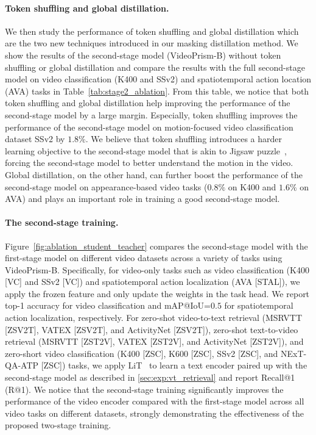 \documentclass{article}
\theoremstyle{plain}
\theoremstyle{definition}
\theoremstyle{remark}
\newcommand{\OURS}{VideoPrism\xspace}
\begin{document}
\paragraph{Token shuffling and global distillation.} We then study the performance of token shuffling and global distillation which are the two new techniques introduced in our masking distillation method.
We show the results of the second-stage model (\OURS-B) without token shuffling or global distillation and compare the results with the full second-stage model on video classification (K400 and SSv2) and spatiotemporal action location (AVA) tasks in Table~\ref{tab:stage2_ablation}.
From this table, we notice that both token shuffling and global distillation help improving the performance of the second-stage model by a large margin.
Especially, token shuffling improves the performance of the second-stage model on motion-focused video classification dataset SSv2 by $1.8\%$.
We believe that token shuffling introduces a harder learning objective to the second-stage model that is akin to Jigsaw puzzle~\cite{noroozi2016unsupervised}, forcing the second-stage model to better understand the motion in the video.
Global distillation, on the other hand, can further boost the performance of the second-stage model on appearance-based video tasks ($0.8\%$ on K400 and $1.6\%$ on AVA) and plays an important role in training a good second-stage model.

\paragraph{The second-stage training.} Figure~\ref{fig:ablation_student_teacher} compares the second-stage model with the first-stage model on different video datasets across a variety of tasks using \OURS-B.
Specifically, for video-only tasks such as video classification (K400 [VC] and SSv2 [VC]) and spatiotemporal action localization (AVA [STAL]), we apply the frozen feature and only update the weights in the task head.
We report top-1 accuracy for video classification and mAP@IoU=$0.5$ for spatiotemporal action localization, respectively.
For zero-shot video-to-text retrieval (MSRVTT [ZSV2T], VATEX [ZSV2T], and ActivityNet [ZSV2T]), zero-shot text-to-video retrieval (MSRVTT [ZST2V], VATEX [ZST2V], and ActivityNet [ZST2V]), and zero-short video classification (K400 [ZSC], K600 [ZSC], SSv2 [ZSC], and NExT-QA-ATP [ZSC]) tasks, we apply LiT~\cite{zhai2022lit} to learn a text encoder paired up with the second-stage model as described in \cref{sec:exp:vt_retrieval} and report Recall@1 (R@1).
We notice that the second-stage training significantly improves the performance of the video encoder compared with the first-stage model across all video tasks on different datasets, strongly demonstrating the effectiveness of the proposed two-stage training.
\end{document}
